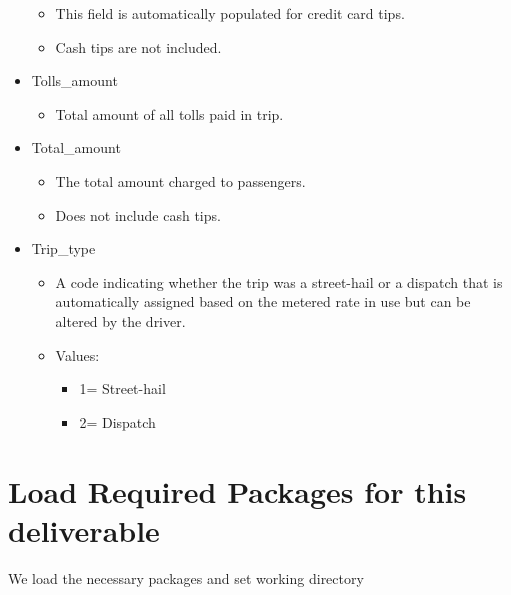 \documentclass[
  18pt,
  a4paper]{article}
\providecommand{\tightlist}{%
  \setlength{\itemsep}{0pt}\setlength{\parskip}{0pt}}
\begin{document}
\begin{itemize}
  \begin{itemize}
  \tightlist
  \item
    This field is automatically populated for credit card tips.
  \item
    Cash tips are not included.\\
  \end{itemize}
\item
  Tolls\_amount

  \begin{itemize}
  \tightlist
  \item
    Total amount of all tolls paid in trip.\\
  \end{itemize}
\item
  Total\_amount

  \begin{itemize}
  \tightlist
  \item
    The total amount charged to passengers.
  \item
    Does not include cash tips.\\
  \end{itemize}
\item
  Trip\_type

  \begin{itemize}
  \tightlist
  \item
    A code indicating whether the trip was a street-hail or a dispatch
    that is automatically assigned based on the metered rate in use but
    can be altered by the driver.
  \item
    Values:

    \begin{itemize}
    \tightlist
    \item
      1= Street-hail
    \item
      2= Dispatch
    \end{itemize}
  \end{itemize}
\end{itemize}

\hypertarget{load-required-packages-for-this-deliverable}{%
\section{Load Required Packages for this
deliverable}\label{load-required-packages-for-this-deliverable}}

We load the necessary packages and set working directory
\end{document}
